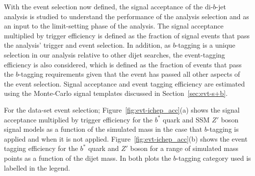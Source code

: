 With the event selection now defined,
the signal acceptance of the di-$b$-jet analysis is studied
to understand the performance of the analysis selection
and as an input to the limit-setting phase of the analysis.
The signal acceptance multiplied by trigger efficiency is defined as the 
fraction of signal events that pass the analysis' trigger and event selection.
In addition, as $b$-tagging is a unique selection in our analysis relative to other dijet searches,
the event-tagging efficiency is also considered, which is defined as the fraction of events that pass
the $b$-tagging requirements given that the event has passed all other aspects of the event selection.
Signal acceptance and event tagging efficiency are estimated using the
Monte-Carlo signal templates discussed in Section~\ref{sec:evt-s+b}.

For the \summer{} data-set event selection;
Figure~\ref{fig:evt-ichep_acc}(a) shows the signal acceptance multiplied by trigger efficiency
for the $b^*$ quark and SSM $Z'$ boson signal models
as a function of the simulated mass
in the case that $b$-tagging is applied and when it is not applied.
Figure~\ref{fig:evt-ichep_acc}(b) shows the event tagging efficiency
for the $b^*$ quark and $Z'$ boson for a range of simulated mass points
as a function of the dijet mass.
In both plots the $b$-tagging category used is labelled in the legend.

